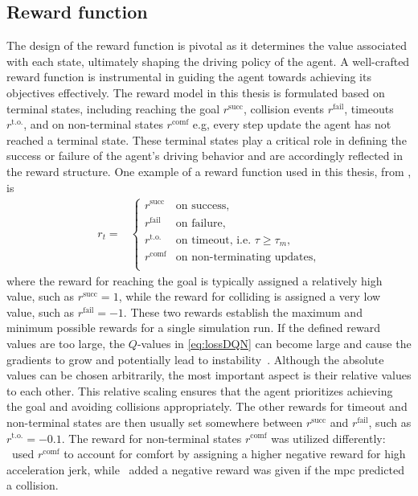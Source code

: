 \subsection{Reward function}
\label{ch:reward_function_def}
The design of the reward function is pivotal as it determines the value associated with each state, ultimately shaping the driving policy of the agent. A well-crafted reward function is instrumental in guiding the agent towards achieving its objectives effectively.
The reward model in this thesis is formulated based on terminal states, including reaching the goal $r^\mathrm{succ}$, collision events $r^\mathrm{fail}$, timeouts $r^\mathrm{t.o.}$, and on non-terminal states $r^\mathrm{comf}$ e.g, every step update the agent has not reached a terminal state. These terminal states play a critical role in defining the success or failure of the agent's driving behavior and are accordingly reflected in the reward structure. One example of a reward function used in this thesis, from \paperMPC, is 
\begin{align}\label{eq:thesis_reward_function}
	r_t = &\begin{cases}
	r^\mathrm{succ} & \text{on success, }\\
	r^\mathrm{fail} & \text{on failure},\\
	r^\mathrm{t.o.} & \text{on timeout, i.e. } \tau \ge \tau_m,\\
	r^\mathrm{comf} & \text{on non-terminating updates},\\
	\end{cases} 
\end{align}
where the reward for reaching the goal is typically assigned a relatively high value, such as $r^\mathrm{succ}=1$, while the reward for colliding is assigned a very low value, such as $r^\mathrm{fail}=-1$. These two rewards establish the maximum and minimum possible rewards for a single simulation run. If the defined reward values are too large, the $Q$-values in \eqref{eq:lossDQN} can become large and cause the gradients to grow and potentially lead to instability~\cite{VanHasseltLearningMagnitude}. Although the absolute values can be chosen arbitrarily, the most important aspect is their relative values to each other. This relative scaling ensures that the agent prioritizes achieving the goal and avoiding collisions appropriately. The other rewards for timeout and non-terminal states are then usually set somewhere between $r^\mathrm{succ}$ and $r^\mathrm{fail}$, such as $r^\mathrm{t.o.}=-0.1$. The reward for non-terminal states $r^\mathrm{comf}$ was utilized differently: \paperLSTM \ used $r^\mathrm{comf}$ to account for comfort by assigning a higher negative reward for high acceleration jerk, while \paperMPC \ added a negative reward was given if the \gls{mpc} predicted a collision.


